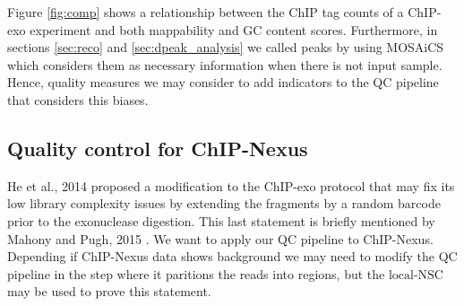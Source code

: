 \documentclass[11pt]{article}\usepackage[]{graphicx}\usepackage[]{color}
\begin{document}
Figure \ref{fig:comp} shows a relationship between the ChIP tag counts
of a ChIP-exo experiment and both mappability and GC content
scores. Furthermore, in sections \ref{sec:reco} and
\ref{sec:dpeak_analysis} we called peaks by using MOSAiCS which
considers them as necessary information when there is not input
sample. Hence, quality measures we may consider to add indicators to
the QC pipeline that considers this biases.

\subsection{Quality control for ChIP-Nexus}
\label{sec:nexus}

He et al., 2014 \cite{chipnexus} proposed a modification to the
ChIP-exo protocol that may fix its low library complexity issues by
extending the fragments by a random barcode prior to the exonuclease
digestion. This last statement is briefly mentioned by Mahony and
Pugh, 2015 \cite{exo_review}. We want to apply our QC pipeline to
ChIP-Nexus. Depending if ChIP-Nexus data shows background we may need
to modify the QC pipeline in the step where it paritions the reads
into regions, but the $\mbox{local-NSC}$ may be used to prove this
statement.



\newpage


\nocite{exo_gb}
\nocite{maplot1}
\nocite{maplot2}
\end{document}
